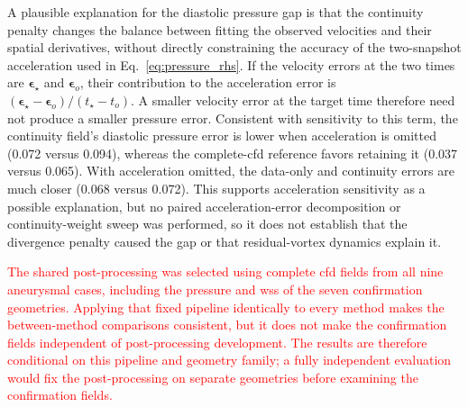 \documentclass[12pt,a4paper]{article}
\newcommand{\cfdrevision}[1]{\textcolor{red}{#1}}
\newcommand{\CFD}{\ac{cfd}\xspace}
\newcommand{\WSS}{\ac{wss}\xspace}
\theoremstyle{definition}
\numberwithin{equation}{section}
\begin{document}
A plausible explanation for the diastolic pressure gap is that the continuity penalty changes the balance between fitting the observed velocities and their spatial derivatives, without directly constraining the accuracy of the two-snapshot acceleration used in Eq.~\eqref{eq:pressure_rhs}. If the velocity errors at the two times are $\boldsymbol\epsilon_\star$ and $\boldsymbol\epsilon_o$, their contribution to the acceleration error is $(\boldsymbol\epsilon_\star-\boldsymbol\epsilon_o)/(t_\star-t_o)$. A smaller velocity error at the target time therefore need not produce a smaller pressure error. Consistent with sensitivity to this term, the continuity field's diastolic pressure error is lower when acceleration is omitted (0.072 versus 0.094), whereas the complete-\CFD reference favors retaining it (0.037 versus 0.065). With acceleration omitted, the data-only and continuity errors are much closer (0.068 versus 0.072). This supports acceleration sensitivity as a possible explanation, but no paired acceleration-error decomposition or continuity-weight sweep was performed, so it does not establish that the divergence penalty caused the gap or that residual-vortex dynamics explain it.

\cfdrevision{The shared post-processing was selected using complete \CFD fields from all nine aneurysmal cases, including the pressure and \WSS of the seven confirmation geometries. Applying that fixed pipeline identically to every method makes the between-method comparisons consistent, but it does not make the confirmation fields independent of post-processing development. The results are therefore conditional on this pipeline and geometry family; a fully independent evaluation would fix the post-processing on separate geometries before examining the confirmation fields.}
\end{document}
